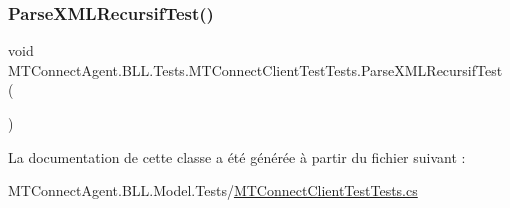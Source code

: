 \subsubsection{\texorpdfstring{Parse\+X\+M\+L\+Recursif\+Test()}{ParseXMLRecursifTest()}}
{\footnotesize\ttfamily void M\+T\+Connect\+Agent.\+B\+L\+L.\+Tests.\+M\+T\+Connect\+Client\+Test\+Tests.\+Parse\+X\+M\+L\+Recursif\+Test (\begin{DoxyParamCaption}{ }\end{DoxyParamCaption})\hspace{0.3cm}{\ttfamily [inline]}}



La documentation de cette classe a été générée à partir du fichier suivant \+:\begin{DoxyCompactItemize}
\item 
M\+T\+Connect\+Agent.\+B\+L\+L.\+Model.\+Tests/\mbox{\hyperlink{_m_t_connect_client_test_tests_8cs}{M\+T\+Connect\+Client\+Test\+Tests.\+cs}}\end{DoxyCompactItemize}
